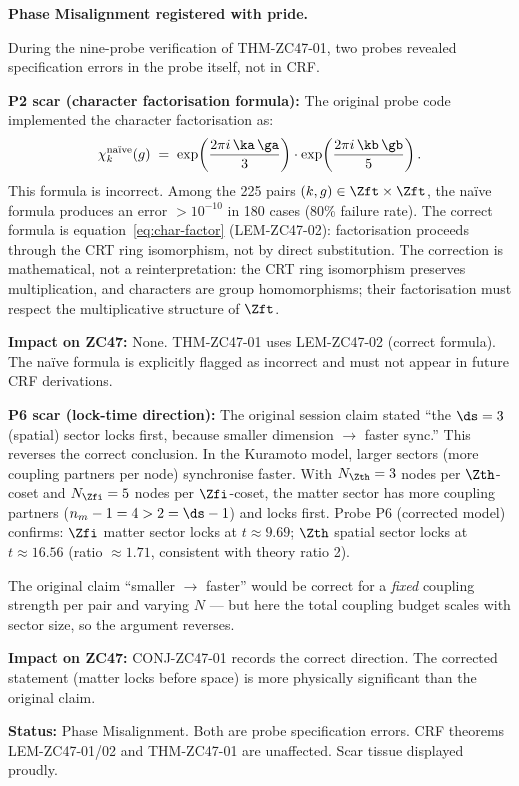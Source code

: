 \documentclass[12pt, a4paper]{article}
\begin{document}
\begin{openqbox}[title={PM-ZC47-01: Two Probe Specification
  Errors (Scar Tissue)}]
\textbf{Phase Misalignment registered with pride.}

During the nine-probe verification of THM-ZC47-01, two probes
revealed specification errors in the probe itself, not in CRF.

\medskip
\textbf{P2 scar (character factorisation formula):}
The original probe code implemented the character factorisation as:
\[
  \chi_k^{\text{na\"ive}}(g) \;=\;
  \exp\!\left(\frac{2\pi i\,\ka\,\ga}{3}\right)
  \cdot
  \exp\!\left(\frac{2\pi i\,\kb\,\gb}{5}\right).
\]
This formula is incorrect.
Among the 225 pairs $(k,g) \in \Zft \times \Zft$, the na\"ive
formula produces an error $> 10^{-10}$ in 180 cases (80\% failure rate).
The correct formula is equation~\eqref{eq:char-factor}
(LEM-ZC47-02): factorisation proceeds through the CRT ring
isomorphism, not by direct substitution.
The correction is mathematical, not a reinterpretation: the CRT
ring isomorphism preserves multiplication, and characters are
group homomorphisms; their factorisation must respect the
multiplicative structure of $\Zft$.

\textbf{Impact on ZC47:} None.
THM-ZC47-01 uses LEM-ZC47-02 (correct formula).
The na\"ive formula is explicitly flagged as incorrect and must not
appear in future CRF derivations.

\medskip
\textbf{P6 scar (lock-time direction):}
The original session claim stated ``the $\ds = 3$ (spatial) sector
locks first, because smaller dimension $\to$ faster sync.''
This reverses the correct conclusion.
In the Kuramoto model, larger sectors (more coupling partners per
node) synchronise faster.
With $N_{\Zth} = 3$ nodes per $\Zth$-coset and $N_{\Zfi} = 5$
nodes per $\Zfi$-coset, the matter sector has more coupling
partners ($n_m - 1 = 4 > 2 = \ds - 1$) and locks first.
Probe P6 (corrected model) confirms: $\Zfi$ matter sector locks
at $t \approx 9.69$; $\Zth$ spatial sector locks at $t \approx 16.56$
(ratio $\approx 1.71$, consistent with theory ratio 2).

The original claim ``smaller $\to$ faster'' would be correct
for a \emph{fixed} coupling strength per pair and varying $N$
--- but here the total coupling budget scales with sector size,
so the argument reverses.

\textbf{Impact on ZC47:} CONJ-ZC47-01 records the correct
direction. The corrected statement (matter locks before space) is
more physically significant than the original claim.

\textbf{Status:} Phase Misalignment.
Both are probe specification errors.
CRF theorems LEM-ZC47-01/02 and THM-ZC47-01 are unaffected.
Scar tissue displayed proudly.
\end{openqbox}
\end{document}

